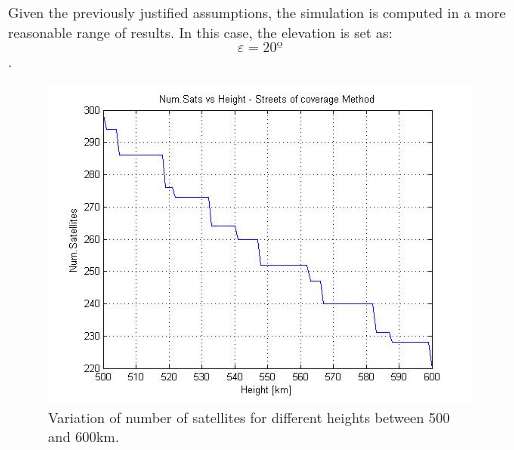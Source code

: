 


Given the previously justified assumptions, the simulation is computed in a more reasonable range of results. In this case, the elevation is set as: $$\varepsilon = 20º$$.

\begin{figure}[H]
\begin{center}
\includegraphics[scale=0.7]{PolarOrbits/Polar.jpg}
\caption{Variation of number of satellites for different heights between 500 and 600km.}
\end{center}
\end{figure}


%
%